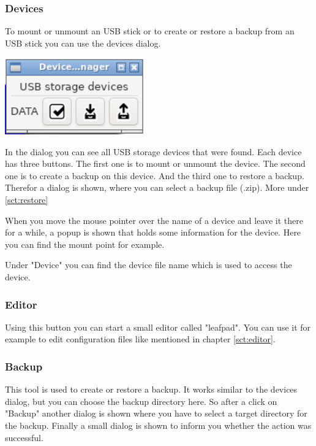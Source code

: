 \documentclass[a4paper,12pt,twoside]{article}
\begin{document}
\subsubsection{Devices}
\label{sct:dialog_devices}
To mount or unmount an USB stick or
to create or restore a backup from an USB stick you can use
the devices dialog.

\bigskip
\begin{minipage}{\linewidth}
  \centering
  \captionsetup{type=figure}
  \includegraphics[width=6cm]{screenshots/efalive_setup_devices_dialog.png}
  \label{fig:dialog_devices}
\end{minipage}

In the dialog you can see all USB storage devices that were found. Each
device has three buttons. The first one is to mount or unmount the
device. The second one is to create a backup on this device. And the
third one to restore a backup. Therefor a dialog is shown, where you
can select a backup file (.zip). More under \ref{sct:restore}

When you move the mouse pointer over the name of a device and leave it
there for a while, a popup is shown that holds some information for the
device. Here you can find the mount point for example.

Under "Device" you can find the device file
name which is used to access the device.


\subsubsection{Editor}
\label{sct:gui_editor}
Using this button you can start a
small editor called "leafpad". You can use
it for example to edit configuration files like mentioned in chapter
\ref{sct:editor}.


\subsubsection{Backup}
\label{sct:dialog_backup}
This tool is used to create or restore
a backup. It works similar to the devices dialog, but you can choose
the backup directory here. So after a click on
"Backup" another dialog is shown where you
have to select a target directory for the backup. Finally a small
dialog is shown to inform you whether the action was successful.
\end{document}
